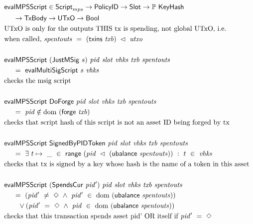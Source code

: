 \begin{figure*}[htb]
  \begin{align*}
    & \fun{evalMPSScript} \in\ScriptMPS\to\PolicyID\to\Slot\to\powerset\KeyHash \\
    &~~~~\to\TxBody\to\UTxO \to\Bool  \\
    & \text{UTxO is only for the outputs THIS tx is spending, not global UTxO, i.e.} \\
    & \text{when called,}~\var{spentouts}~=~(\fun{txins}~\var{txb}) ~\restrictdom~\var{utxo} \\~\\
    & \fun{evalMPSScript}  ~(\type{JustMSig}~s)~\var{pid}~\var{slot}~\var{vhks}
     ~\var{txb}~\var{spentouts} \\
    &~~~~ =~ \fun{evalMultiSigScript}~s~\var{vhks} \\
    & \text {checks the msig script}\\~\\
    & \fun{evalMPSScript}
     ~\type{DoForge}~\var{pid}~ \var{slot}~\var{vhks} ~\var{txb}~\var{spentouts} \\
    &~~~~ =~ \var{pid} \notin \dom~(\fun{forge}~\var{txb}) \\
    & \text {checks that script hash of this script is not an asset ID being forged by tx}  \\~\\
    & \fun{evalMPSScript}
     ~\type{SignedByPIDToken}~\var{pid}~ \var{slot}~\var{vhks} ~\var{txb}~\var{spentouts} \\
    &~~~~ =~ \exists~t\mapsto ~\_~\in~ \fun{range}~(\var{pid}~ \restrictdom~(\fun{ubalance}~\var{spentouts})) ~:~ t~\in~\var{vhks} \\
    & \text{checks that tx is signed by a key whose hash is the name of a token in this asset}
    \\~\\
    & \fun{evalMPSScript}
     ~(\type{SpendsCur}~\var{pid'})~\var{pid}~ \var{slot}~\var{vhks} ~\var{txb}~\var{spentouts} \\
    &~~~~ =~ (\var{pid'}~\neq~\Nothing ~\wedge ~\var{pid'}~\in~ \dom~(\fun{ubalance}~\var{spentouts}))\\
    &~~~~~~ \vee (\var{pid'}~=~\Nothing ~\wedge ~\var{pid}~\in~ \dom~(\fun{ubalance}~\var{spentouts})) \\
    & \text{checks that this transaction spends asset pid' OR itself if}~\var{pid'}~=~\Nothing
    \\~\\

\end{align*}
\end{figure*}
